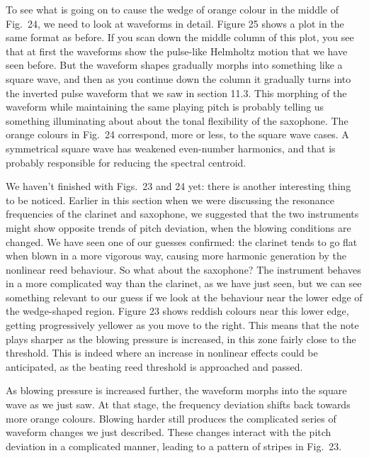   To see what is going on to cause the wedge of orange colour in the middle of 
  Fig.\ 24, we need to look at waveforms in detail. Figure 25 shows a plot in 
  the same format as before. If you scan down the middle column of this plot, 
  you see that at first the waveforms show the pulse-like Helmholtz motion that 
  we have seen before. But the waveform shapes gradually morphs into something 
  like a square wave, and then as you continue down the column it gradually 
  turns into the inverted pulse waveform that we saw in section 11.3. This 
  morphing of the waveform while maintaining the same playing pitch is probably 
  telling us something illuminating about about the tonal flexibility of the 
  saxophone. The orange colours in Fig.\ 24 correspond, more or less, to the 
  square wave cases. A symmetrical square wave has weakened even-number 
  harmonics, and that is probably responsible for reducing the spectral 
  centroid. 

  We haven’t finished with Figs.\ 23 and 24 yet: there is another interesting 
  thing to be noticed. Earlier in this section when we were discussing the 
  resonance frequencies of the clarinet and saxophone, we suggested that the 
  two instruments might show opposite trends of pitch deviation, when the 
  blowing conditions are changed. We have seen one of our guesses confirmed: 
  the clarinet tends to go flat when blown in a more vigorous way, causing more 
  harmonic generation by the nonlinear reed behaviour. So what about the 
  saxophone? The instrument behaves in a more complicated way than the 
  clarinet, as we have just seen, but we can see something relevant to our 
  guess if we look at the behaviour near the lower edge of the wedge-shaped 
  region. Figure 23 shows reddish colours near this lower edge, getting 
  progressively yellower as you move to the right. This means that the note 
  plays sharper as the blowing pressure is increased, in this zone fairly close 
  to the threshold. This is indeed where an increase in nonlinear effects could 
  be anticipated, as the beating reed threshold is approached and passed. 

  As blowing pressure is increased further, the waveform morphs into the square 
  wave as we just saw. At that stage, the frequency deviation shifts back 
  towards more orange colours. Blowing harder still produces the complicated 
  series of waveform changes we just described. These changes interact with the 
  pitch deviation in a complicated manner, leading to a pattern of stripes in 
  Fig.\ 23. 

